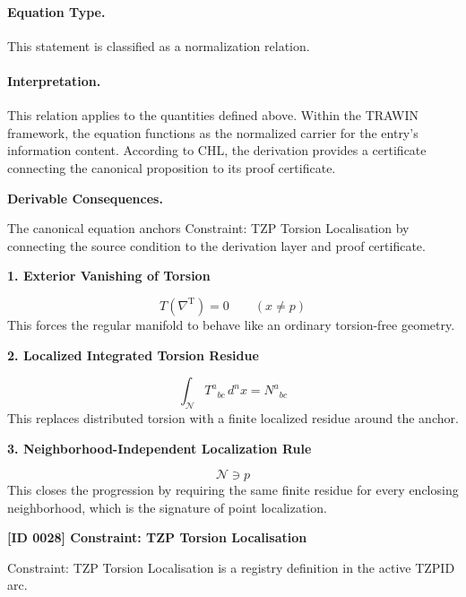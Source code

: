 \paragraph{Equation Type.}
This statement is classified as a normalization relation.

\paragraph{Interpretation.}
This relation applies to the quantities defined above. Within the TRAWIN framework, the equation functions as the normalized carrier for the entry’s information content. According to CHL, the derivation provides a certificate connecting the canonical proposition to its proof certificate.

\par\vspace{0.35em}
\noindent\textbf{Derivable Consequences.}\quad
\begingroup
\footnotesize
\raggedright
The canonical equation anchors Constraint: TZP Torsion Localisation by connecting the source condition to the derivation layer and proof certificate.
\par\endgroup

\noindent\textbf{1. Exterior Vanishing of Torsion}\par
\[
T(\nabla^{\mathrm{T}})=0
\qquad (x\neq p)
\]
\noindent This forces the regular manifold to behave like an ordinary torsion-free geometry.\par
\noindent\textbf{2. Localized Integrated Torsion Residue}\par
\[
\int_{\mathcal N}
T^{a}{}_{bc}\,d^{n}x
=
N^{a}{}_{bc}
\]
\noindent This replaces distributed torsion with a finite localized residue around the anchor.\par
\noindent\textbf{3. Neighborhood-Independent Localization Rule}\par
\[
\mathcal N \ni p
\]
\noindent This closes the progression by requiring the same finite residue for every enclosing neighborhood, which is the signature of point localization.\par

\clearpage
\noindent\textbf{[ID 0028] Constraint: TZP Torsion Localisation}\par
\vspace{0.35em}
\begingroup\small
{}
Constraint: TZP Torsion Localisation is a registry definition in the active TZPID arc.

